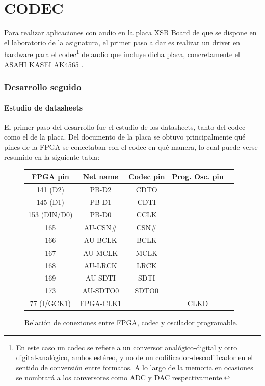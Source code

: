 \part{CODEC}

Para realizar aplicaciones con audio en la placa XSB Board \cite{XSBBoard} de que se dispone en el laboratorio de la asignatura, el primer paso a dar es realizar un driver en hardware para el codec\footnote{En este caso un codec se refiere a un conversor analógico-digital y otro digital-analógico, ambos estéreo, y no de un codificador-descodificador en el sentido de conversión entre formatos. A lo largo de la memoria en ocasiones se nombrará a los conversores como ADC y DAC respectivamente.} de audio que incluye dicha placa, concretamente el ASAHI KASEI AK4565 \cite{AK4565}.

	
	
\section{Desarrollo seguido}

	\subsection{Estudio de datasheets}
		El primer paso del desarrollo fue el estudio de los datasheets, tanto del codec como el de la placa. Del documento de la placa se obtuvo principalmente qué pines de la FPGA se conectaban con el codec en qué manera, lo cual puede verse resumido en la siguiente tabla:


\begin{figure}[H]

\centering
	\begin{tabular}{|c|c|c|c|c|}
		\hline
		\textbf{FPGA pin} & \textbf{Net name} & \textbf{Codec pin} & \textbf{Prog. Osc. pin}\\
		\hline
		141 (D2) & PB-D2 & CDTO &\\
		\hline
		145 (D1) & PB-D1 & CDTI &\\
		\hline
		153 (DIN/D0) & PB-D0 & CCLK &\\
		\hline
		165 & AU-CSN\# & CSN\# &\\
		\hline
		166 &  AU-BCLK & BCLK &\\
		\hline
		167 &  AU-MCLK & MCLK &\\
		\hline
		168 &  AU-LRCK & LRCK &\\
		\hline
		169 &  AU-SDTI & SDTI &\\
		\hline
		173 &  AU-SDTO0 & SDTO0 &\\
		\hline
		77 (I/GCK1) & FPGA-CLK1 & & CLKD\\
		\hline
	\end{tabular}

  \caption{Relación de conexiones entre FPGA, codec y oscilador programable.}
\end{figure}


